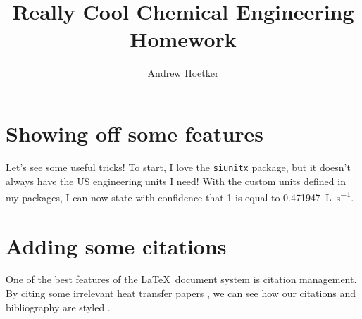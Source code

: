 \documentclass[12pt,letterpaper]{article}
\title{Really Cool Chemical Engineering Homework}
\author{Andrew Hoetker}
\begin{document}
    \maketitle

    \section{Showing off some features}

    Let's see some useful tricks! To start, I love the \texttt{siunitx} package, but it doesn't always have the US engineering units I need! With the custom units defined in my packages, I can now state with confidence that \SI{1}{\cfm} is equal to \SI{0.471947}{\liter\per\second}.

    \section{Adding some citations}

    One of the best features of the \LaTeX\ document system is citation management. By citing some irrelevant heat transfer papers \autocite{bohnetFoulingHeatTransfer1987,prabhanjanComparisonHeatTransfer2002}, we can see how our citations and bibliography are styled \autocite{wongLogMeanHeat2009}.

    \printbibliography
\end{document}
